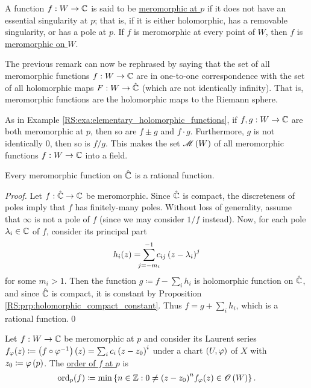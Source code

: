 \documentclass[../Moduli_Spaces_of_Riemann_Surfaces.tex]{subfiles}
\begin{document}
    \begin{definition}
        A function $f:W\to\mathbb{C}$ is said to be \ul{meromorphic at $p$} if it does not have an essential singularity at $p$; that is, if it is either holomorphic, has a removable singularity, or has a pole at $p$. If $f$ is meromorphic at every point of $W$, then $f$ is \ul{meromorphic on $W$}.
    \end{definition}
    \begin{remark}
        The previous remark can now be rephrased by saying that the set of all meromorphic functions $f:W\to\mathbb{C}$ are in one-to-one correspondence with the set of all holomorphic maps $F:W\to\hat{\mathbb{C}}$ (which are not identically infinity). That is, meromorphic functions are the holomorphic maps to the Riemann sphere.\exqed
    \end{remark}
    \begin{example}
        As in Example \ref{RS:exa:elementary_holomorphic_functions}, if $f,g:W\to\mathbb{C}$ are both meromorphic at $p$, then so are $f\pm g$ and $f\cdot g$. Furthermore, $g$ is not identically $0$, then so is $f/g$. This makes the set $\mathscr{M}\left(W\right)$ of all meromorphic functions $f:W\to\mathbb{C}$ into a field.\exqed
    \end{example}
    \begin{proposition}\label{RS:prp:meromorphic_Riemann_sphere_rational}
        Every meromorphic function on $\hat{\mathbb{C}}$ is a rational function.
    \end{proposition}
    \begin{proof}
        Let $f:\hat{\mathbb{C}}\to\mathbb{C}$ be meromorphic. Since $\hat{\mathbb{C}}$ is compact, the discreteness of poles imply that $f$ has finitely-many poles. Without loss of generality, assume that $\infty$ is not a pole of $f$ (since we may consider $1/f$ instead). Now, for each pole $\lambda_i\in\mathbb{C}$ of $f$, consider its principal part
        \begin{equation*}
            h_i\!\l(z\r)=\sum_{\mathclap{j=-m_i}}^{-1}c_{ij}\l(z-\lambda_i\r)^j
        \end{equation*}
        for some $m_i>1$. Then the function $g\coloneqq f-\sum_ih_i$ is holomorphic function on $\hat{\mathbb{C}}$, and since $\hat{\mathbb{C}}$ is compact, it is constant by Proposition \ref{RS:prp:holomorphic_compact_constant}. Thus $f=g+\sum_ih_i$, which is a rational function.\qed
    \end{proof}
    \begin{definition}\label{RS:def:order}
        Let $f:W\to\mathbb{C}$ be meromorphic at $p$ and consider its Laurent series $f_\varphi\!\left(z\right)\coloneqq\left(f\circ\varphi^{-1}\right)\left(z\right)=\sum_{i}c_i\left(z-z_0\right)^i$ under a chart $\left(U,\varphi\right)$ of $X$ with $z_0\coloneqq\varphi\left(p\right)$. The \ul{order of $f$ at $p$} is
        \begin{equation*}
            \operatorname{ord}_p\!\left(f\right)\coloneqq\operatorname{min}\left\{n\in\mathbb{Z}:0\neq\left(z-z_0\right)^n\!f_\varphi\!\left(z\right)\in\mathscr{O}\left(W\right)\right\}.
        \end{equation*}
    \end{definition}
\end{document}
